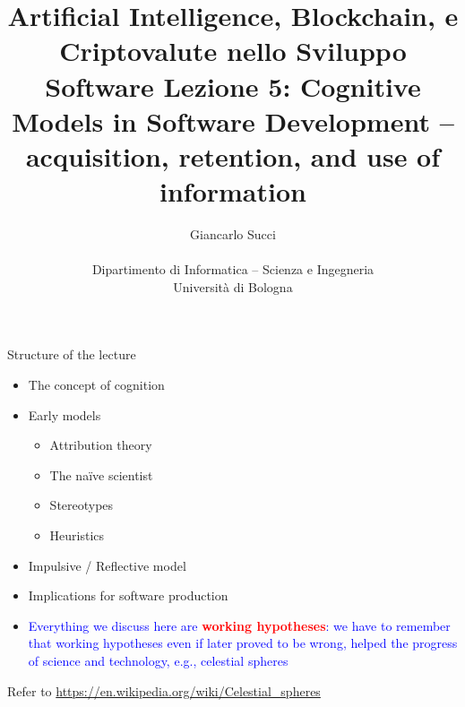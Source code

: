 \documentclass{beamer}
\title[L04]{Artificial Intelligence, Blockchain, e Criptovalute nello Sviluppo Software \newline\newline
Lezione 5: Cognitive Models in Software Development -- acquisition, retention, and use of information} %
\author[{\tiny Giancarlo Succi }]{Giancarlo Succi\\\\ Dipartimento di Informatica -- Scienza e Ingegneria\\Universit\`{a} di Bologna\\
\bftt{g.succi@unibo.it}
} %
\institute[unibo] %
\date{} %
\begin{document}
\begin{frame}
\titlepage %

\end{frame}





\begin{frame}
{\centerline{Structure of the lecture}}
\begin{itemize}
    \item The concept of cognition
    \item Early models
    \begin{itemize}
        \item Attribution theory
        \item The na\"{i}ve scientist
        \item Stereotypes
        \item Heuristics
    \end{itemize} 
    \item Impulsive / Reflective model
    \item Implications for software production
    \item \textcolor{blue}{Everything we discuss here are \textcolor{red}{\bf working hypotheses}: we have to remember that working hypotheses even if later proved to be wrong, helped the progress of science and technology, e.g., celestial spheres}
\end{itemize} 
\begin{center}
    \tiny{Refer to \url{https://en.wikipedia.org/wiki/Celestial_spheres}}
\end{center}

\end{frame}
\end{document}
